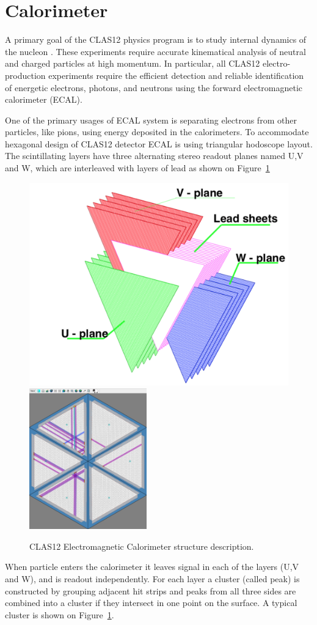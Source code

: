 \section{Calorimeter}

A primary goal of the CLAS12 physics program is to study internal dynamics of the nucleon . 
These experiments require accurate kinematical analysis of neutral and charged particles at high momentum. 
In particular, all CLAS12 electro-production experiments require the efficient detection and reliable identification 
of energetic electrons, photons, and neutrons using the forward electromagnetic calorimeter (ECAL).

One of the primary usages of ECAL system is separating electrons from other particles, like pions, using 
energy deposited in the calorimeters. To accommodate hexagonal design of CLAS12 detector ECAL is using 
triangular hodoscope layout. The scintillating layers have three alternating stereo readout planes named U,V and W, 
which are interleaved with layers of lead as shown on Figure~\ref{clas12:ecal}

\begin{figure}[!ht]
\begin{center}
 \includegraphics[width=3.in]{images/calorimeter_layers.png}
 \includegraphics[width=2in]{images/ecal_view.png}
\caption { CLAS12 Electromagnetic Calorimeter structure description.}
 \label{clas12:ecal}
 \end{center}
\end{figure}

When particle enters the calorimeter it leaves signal in each of the layers (U,V and W), and is readout independently.
For each layer a cluster (called peak) is constructed by grouping adjacent hit strips and peaks from all three sides are combined into a cluster if they intersect in one point on the surface. A typical cluster is shown on Figure~\ref{clas12:ecal}.
